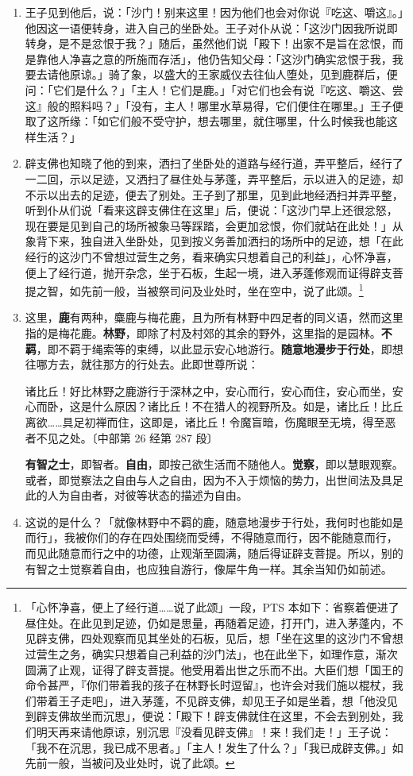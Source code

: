 \begin{enumerate}
\item 王子见到他后，说：「沙门！别来这里！因为他们也会对你说『吃这、嚼这』。」他因这一语便转身，进入自己的坐卧处。王子对仆从说：「这沙门因我所说即转身，是不是忿恨于我？」随后，虽然他们说「殿下！出家不是旨在忿恨，而是靠他人净喜之意的所施而存活」，他仍告知父母：「这沙门确实忿恨于我，我要去请他原谅。」骑了象，以盛大的王家威仪去往仙人堕处，见到鹿群后，便问：「它们是什么？」「主人！它们是鹿。」「对它们也会有说『吃这、嚼这、尝这』般的照料吗？」「没有，主人！哪里水草易得，它们便住在哪里。」王子便取了这所缘：「如它们般不受守护，想去哪里，就住哪里，什么时候我也能这样生活？」
\item 辟支佛也知晓了他的到来，洒扫了坐卧处的道路与经行道，弄平整后，经行了一二回，示以足迹，又洒扫了昼住处与茅蓬，弄平整后，示以进入的足迹，却不示以出去的足迹，便去了别处。王子到了那里，见到此地经洒扫并弄平整，听到仆从们说「看来这辟支佛住在这里」后，便说：「这沙门早上还很忿怒，现在要是见到自己的场所被象马等踩踏，会更加忿恨，你们就站在此处！」从象背下来，独自进入坐卧处，见到按义务善加洒扫的场所中的足迹，想「在此经行的这沙门不曾想过营生之务，看来确实只想着自己的利益」，心怀净喜，便上了经行道，抛开杂念，坐于石板，生起一境，进入茅蓬修观而证得辟支菩提之智，如先前一般，当被祭司问及业处时，坐在空中，说了此颂。\footnote{「心怀净喜，便上了经行道……说了此颂」一段，PTS 本如下：省察着便进了昼住处。在此见到足迹，仍如是思量，再随着足迹，打开门，进入茅蓬内，不见辟支佛，四处观察而见其坐处的石板，见后，想「坐在这里的这沙门不曾想过营生之务，确实只想着自己利益的沙门法」，也在此坐下，如理作意，渐次圆满了止观，证得了辟支菩提。他受用着出世之乐而不出。大臣们想「国王的命令甚严，『你们带着我的孩子在林野长时逗留』，也许会对我们施以棍杖，我们带着王子走吧」，进入茅蓬，不见辟支佛，却见王子如是坐着，想「他没见到辟支佛故坐而沉思」，便说：「殿下！辟支佛就住在这里，不会去到别处，我们明天再来请他原谅，别沉思『没看见辟支佛』！来！我们走！」王子说：「我不在沉思，我已成不思者。」「主人！发生了什么？」「我已成辟支佛。」如先前一般，当被问及业处时，说了此颂。}
\item 这里，\textbf{鹿}有两种，麋鹿与梅花鹿，且为所有林野中四足者的同义语，然而这里指的是梅花鹿。\textbf{林野}，即除了村及村郊的其余的野外，这里指的是园林。\textbf{不羁}，即不羁于绳索等的束缚，以此显示安心地游行。\textbf{随意地漫步于行处}，即想往哪方去，就往那方的行处去。此即世尊所说：\begin{quoting}诸比丘！好比林野之鹿游行于深林之中，安心而行，安心而住，安心而坐，安心而卧，这是什么原因？诸比丘！不在猎人的视野所及。如是，诸比丘！比丘离欲……具足初禅而住，这即是，诸比丘！令魔盲暗，伤魔眼至无境，得至恶者不见之处。{\bluefootnotesize 〔中部第 26 经第 287 段〕}\end{quoting}\textbf{有智之士}，即智者。\textbf{自由}，即按己欲生活而不随他人。\textbf{觉察}，即以慧眼观察。或者，即觉察法之自由与人之自由，因为不入于烦恼的势力，出世间法及具足此的人为自由者，对彼等状态的描述为自由。
\item 这说的是什么？「就像林野中不羁的鹿，随意地漫步于行处，我何时也能如是而行」，我被你们的存在四处围绕而受缚，不得随意而行，因不能随意而行，而见此随意而行之中的功德，止观渐至圆满，随后得证辟支菩提。所以，别的有智之士觉察着自由，也应独自游行，像犀牛角一样。其余当知仍如前述。\end{enumerate}

